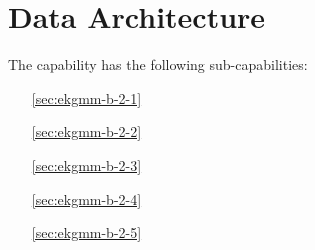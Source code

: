 \chapter{Data Architecture}\label{ch:ekgmm-b-2} %

The \currentname capability has the following sub-capabilities:

\begin{itemize}[leftmargin=.5in]
  \item [\ref{sec:ekgmm-b-2-1}] 
  \item [\ref{sec:ekgmm-b-2-2}] 
  \item [\ref{sec:ekgmm-b-2-3}] 
  \item [\ref{sec:ekgmm-b-2-4}] 
  \item [\ref{sec:ekgmm-b-2-5}] 
\end{itemize}








